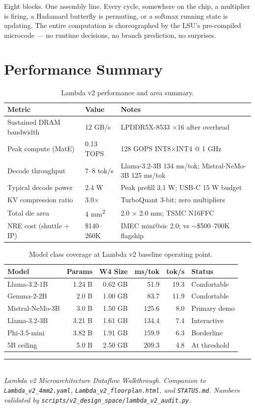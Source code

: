 \documentclass[11pt,letterpaper]{article}
\begin{document}
Eight blocks. One assembly line. Every cycle, somewhere on the chip, a multiplier is firing,
a Hadamard butterfly is permuting, or a softmax running state is updating. The entire
computation is choreographed by the LSU's pre-compiled microcode --- no runtime decisions, no
branch prediction, no surprises.

\section{Performance Summary}

\begin{table}[h!]
\centering
\small
\begin{tabular}{@{}l l p{6cm}@{}}
\toprule
\textbf{Metric} & \textbf{Value} & \textbf{Notes} \\
\midrule
Sustained DRAM bandwidth & 12 GB/s   & LPDDR5X-8533 $\times$16 after overhead \\
Peak compute (MatE)      & 0.13 TOPS & 128 GOPS INT8$\times$INT4 @ 1 GHz \\
Decode throughput        & 7--8 tok/s & Llama-3.2-3B 134 ms/tok; Mistral-NeMo-3B 125 ms/tok \\
Typical decode power     & 2.4 W     & Peak prefill 3.1 W; USB-C 15 W budget \\
KV compression ratio     & 3.0$\times$ & TurboQuant 3-bit; zero multipliers \\
Total die area           & 4 mm\textsuperscript{2}   & 2.0 $\times$ 2.0 mm; TSMC N16FFC \\
NRE cost (shuttle + IP)  & \$140--260K & IMEC mini@sic 2.0; vs $\sim$\$500--700K flagship \\
\bottomrule
\end{tabular}
\caption{Lambda v2 performance and area summary.}
\end{table}

\begin{table}[h!]
\centering
\small
\begin{tabular}{@{}l r r r r l@{}}
\toprule
\textbf{Model} & \textbf{Params} & \textbf{W4 Size} & \textbf{ms/tok} & \textbf{tok/s} & \textbf{Status} \\
\midrule
Llama-3.2-1B          & 1.24 B & 0.62 GB & 51.9  & 19.3 & Comfortable \\
Gemma-2-2B            & 2.0 B  & 1.00 GB & 83.7  & 11.9 & Comfortable \\
Mistral-NeMo-3B       & 3.0 B  & 1.50 GB & 125.6 & 8.0  & Primary demo \\
Llama-3.2-3B          & 3.21 B & 1.61 GB & 134.4 & 7.4  & Interactive \\
Phi-3.5-mini          & 3.82 B & 1.91 GB & 159.9 & 6.3  & Borderline \\
5B ceiling            & 5.0 B  & 2.50 GB & 209.3 & 4.8  & At threshold \\
\bottomrule
\end{tabular}
\caption{Model class coverage at Lambda v2 baseline operating point.}
\end{table}

\vfill
\noindent\rule{\textwidth}{0.4pt}\\
\textit{Lambda v2 Microarchitecture Dataflow Walkthrough. Companion to
\texttt{Lambda\_v2\_4mm2.yaml}, \texttt{Lambda\_v2\_floorplan.html}, and \texttt{STATUS.md}.
Numbers validated by \texttt{scripts/v2\_design\_space/lambda\_v2\_audit.py}.}
\end{document}
